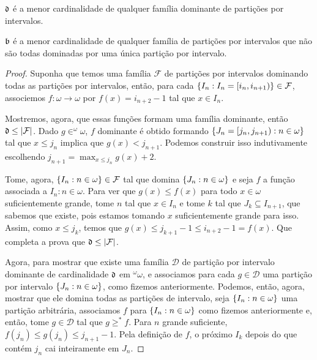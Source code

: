 \begin{theorem}
    $\mathfrak{d}$ é a menor cardinalidade de qualquer família dominante de partições por intervalos.
    
    $\mathfrak{b}$ é a menor cardinalidade de qualquer família de partições por intervalos que não são todas dominadas por uma única partição por intervalo.
\end{theorem}
\begin{proof}
    Suponha que temos uma família $\mathcal F$ de partições por intervalos dominando todas as partições por intervalos, então, para cada $\left\{ I_n : I_n = [i_n, i_{n+1}) \right\} \in \mathcal F$, associemos $f: \omega\to\omega$ por $f(x) = i_{n+2} -1$ tal que $x\in I_n$. 

    Mostremos, agora, que essas funções formam uma família dominante, então $\mathfrak{d} \leq |\mathcal F|$. Dado $g\in ^\omega\omega$, $f$ dominante é obtido formando $\left\{ J_n = [j_n, j_{n+1}) : n\in\omega \right\}$ tal que $x\leq j_n$ implica que $g(x) < j_{n+1}$. Podemos construir isso indutivamente escolhendo $j_{n+1} = \max_{x\leq j_n}{g(x)} + 2$. 

    Tome, agora, $\left\{ I_n : n\in \omega \right\}\in \mathcal F$ tal que domina $\left\{ J_n : n\in\omega \right\}$ e seja $f$ a função associada a ${I_n : n\in \omega}$. Para ver que $g(x)\leq f(x)$ para todo $x\in \omega$ suficientemente grande, tome $n$ tal que $x\in I_n$ e tome $k$ tal que $J_k \subseteq I_{n+1}$, que sabemos que existe, pois estamos tomando $x$ suficientemente grande para isso. Assim, como $x\leq j_k$, temos que $g(x)\leq j_{k+1} -1 \leq i_{n+2} - 1 = f(x)$. Que completa a prova que $\mathfrak{d} \leq |\mathcal F|$. 
    
    Agora, para mostrar que existe uma família $\mathcal D$ de partição por intervalo dominante de cardinalidade $\mathfrak{d}$ em $^\omega\omega$, e associamos para cada $g\in \mathcal D$ uma partição por intervalo $\left\{ J_n : n\in \omega \right\}$, como fizemos anteriormente. Podemos, então, agora, mostrar que ele domina todas as partições de intervalo, seja $\left\{ I_n : n\in\omega \right\}$ uma partição arbitrária, associamos $f$ para $\left\{ I_n : n\in\omega \right\}$ como fizemos anteriormente e, então, tome $g\in \mathcal D$ tal que $g\geq^* f$. Para $n$ grande suficiente, $f(j_n) \leq g(j_n) \leq j_{n+1} - 1$. Pela definição de $f$, o próximo $I_k$ depois do que contém $j_n$ cai inteiramente em $J_n$.
\end{proof}